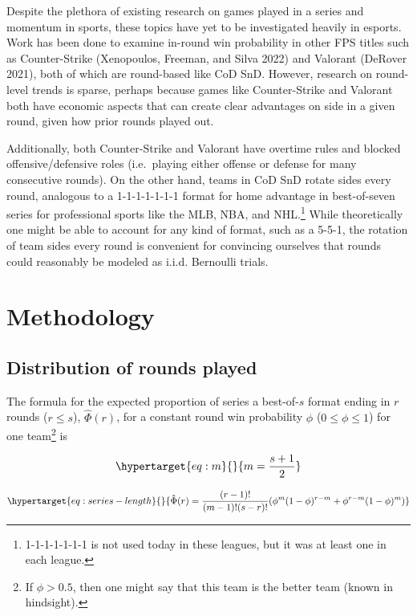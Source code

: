 \documentclass{article}
\begin{document}
Despite the plethora of existing research on games played in a series
and momentum in sports, these topics have yet to be investigated heavily
in esports. Work has been done to examine in-round win probability in
other FPS titles such as Counter-Strike (Xenopoulos, Freeman, and Silva
2022) and Valorant (DeRover 2021), both of which are round-based like
CoD SnD. However, research on round-level trends is sparse, perhaps
because games like Counter-Strike and Valorant both have economic
aspects that can create clear advantages on side in a given round, given
how prior rounds played out.

Additionally, both Counter-Strike and Valorant have overtime rules and
blocked offensive/defensive roles (i.e.~playing either offense or
defense for many consecutive rounds). On the other hand, teams in CoD
SnD rotate sides every round, analogous to a 1-1-1-1-1-1-1 format for
home advantage in best-of-seven series for professional sports like the
MLB, NBA, and NHL.\footnote{1-1-1-1-1-1-1 is not used today in these
  leagues, but it was at least one in each league.} While theoretically
one might be able to account for any kind of format, such as a 5-5-1,
the rotation of team sides every round is convenient for convincing
ourselves that rounds could reasonably be modeled as i.i.d. Bernoulli
trials.

\hypertarget{methodology}{%
\section{Methodology}\label{methodology}}

\hypertarget{sec:method-rounds-played}{%
\subsection{Distribution of rounds
played}\label{sec:method-rounds-played}}

The formula for the expected proportion of series a best-of-\(s\) format
ending in \(r\) rounds (\(r \leq s\)), \(\hat{\Phi}(r)\), for a constant
round win probability \(\phi\) (\(0 \leq \phi \leq 1\)) for one
team\footnote{If \(\phi > 0.5\), then one might say that this team is
  the better team (known in hindsight).} is

\begin{equation}\protect\hypertarget{eq:m}{}{
m = \frac{s + 1}{2}
}\label{eq:m}\end{equation}

\begin{equation}\protect\hypertarget{eq:series-length}{}{
\hat{\Phi}(r) = \frac{(r - 1)!}{(m - 1)!(s - r)!}(\phi^{m}(1 - \phi)^{r - m} + \phi^{r - m}(1 - \phi)^m)
}\label{eq:series-length}\end{equation}
\end{document}

